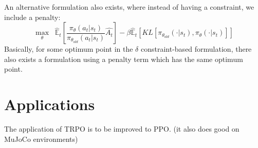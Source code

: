 \documentclass{article}
\begin{document}
An alternative formulation also exists, where instead of having a constraint, we include a penalty:
\[
    \max_\theta \;\; \hat{\mathbb{E}}_{t} \left [ \frac{{\pi_\theta} (a_t|s_t)}{{\pi_{\theta_{old}}} (a_t|s_t)} \hat{A_t} \right] - \beta \hat{\mathbb{E}}_{t} \left [ KL \left[  \pi_{\theta_{old}} (\cdot|s_t), \pi_{\theta} (\cdot|s_t)\right] \right]
\]
Basically, for some optimum point in the \(\delta\) constraint-based formulation, there also exists a formulation using a penalty term which has the same optimum point. 

\section[high]{Applications}
The application of TRPO is to be improved to PPO. 
(it also does good on MuJoCo environments)
\end{document}
